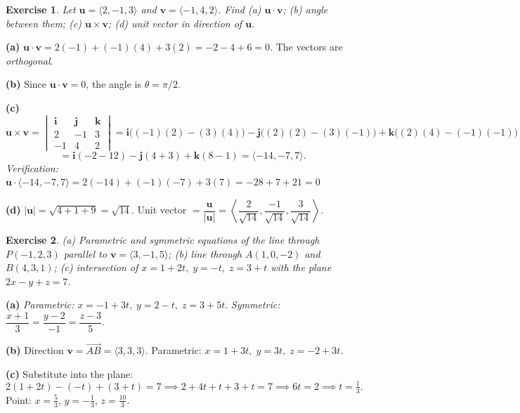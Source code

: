 \documentclass[12pt,a4paper]{article}
\theoremstyle{exstyle}
\newtheorem{exercise}{Exercise}[section]
\begin{document}
\begin{exercise}
Let $\mathbf{u}=\langle 2,-1,3\rangle$ and $\mathbf{v}=\langle -1,4,2\rangle$.
Find (a) $\mathbf{u}\cdot\mathbf{v}$; (b) angle between them; (c) $\mathbf{u}\times\mathbf{v}$;
(d) unit vector in direction of $\mathbf{u}$.
\end{exercise}
\begin{solbox}
\textbf{(a)}
$\mathbf{u}\cdot\mathbf{v}=2(-1)+(-1)(4)+3(2)=-2-4+6=\boxed{0}$.
The vectors are \emph{orthogonal}.

\textbf{(b)} Since $\mathbf{u}\cdot\mathbf{v}=0$, the angle is $\theta=\pi/2$.

\textbf{(c)}
\[
  \mathbf{u}\times\mathbf{v}
  =\begin{vmatrix}\mathbf{i}&\mathbf{j}&\mathbf{k}\\2&-1&3\\-1&4&2\end{vmatrix}
  =\mathbf{i}\bigl((-1)(2)-(3)(4)\bigr)-\mathbf{j}\bigl((2)(2)-(3)(-1)\bigr)+\mathbf{k}\bigl((2)(4)-(-1)(-1)\bigr)
\]
\[
  =\mathbf{i}(-2-12)-\mathbf{j}(4+3)+\mathbf{k}(8-1)=\langle -14,-7,7\rangle.
\]
\emph{Verification:} $\mathbf{u}\cdot\langle-14,-7,7\rangle=2(-14)+(-1)(-7)+3(7)=-28+7+21=0$\checkmark

\textbf{(d)} $|\mathbf{u}|=\sqrt{4+1+9}=\sqrt{14}$.
Unit vector $=\dfrac{\mathbf{u}}{|\mathbf{u}|}=\left\langle\dfrac{2}{\sqrt{14}},\dfrac{-1}{\sqrt{14}},\dfrac{3}{\sqrt{14}}\right\rangle$.
\end{solbox}

\begin{exercise}
(a) Parametric and symmetric equations of the line through $P(-1,2,3)$ parallel to
$\mathbf{v}=\langle 3,-1,5\rangle$; (b) line through $A(1,0,-2)$ and $B(4,3,1)$;
(c) intersection of $x=1+2t,\;y=-t,\;z=3+t$ with the plane $2x-y+z=7$.
\end{exercise}
\begin{solbox}
\textbf{(a)}
\emph{Parametric:} $x=-1+3t,\;y=2-t,\;z=3+5t$.\quad
\emph{Symmetric:} $\dfrac{x+1}{3}=\dfrac{y-2}{-1}=\dfrac{z-3}{5}$.

\textbf{(b)} Direction $\mathbf{v}=\overrightarrow{AB}=\langle 3,3,3\rangle$.
Parametric: $x=1+3t,\;y=3t,\;z=-2+3t$.

\textbf{(c)} Substitute into the plane:
\[
  2(1+2t)-(-t)+(3+t)=7\implies 2+4t+t+3+t=7\implies 6t=2\implies t=\tfrac{1}{3}.
\]
Point: $x=\tfrac{5}{3}$, $y=-\tfrac{1}{3}$, $z=\tfrac{10}{3}$.
\end{solbox}
\end{document}
